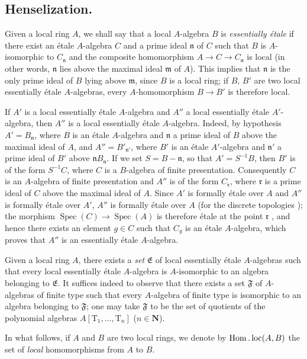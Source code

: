 \subsection{Henselization.}
\label{subsection:IV.18.6}

\begin{env}[18.6.1]
\label{IV.18.6.1}
Given a local ring $A$, we shall say that a local $A$-algebra $B$ is \emph{essentially \'etale} if there exist an \'etale $A$-algebra $C$ and a prime ideal $\mathfrak{n}$ of $C$ such that $B$ is $A$-isomorphic to $C_{\mathfrak{n}}$ and the composite homomorphism $A\to C\to C_{\mathfrak{n}}$ is local (in other words, $\mathfrak{n}$ lies above the maximal ideal $\mathfrak{m}$ of $A$).
This implies  that $\mathfrak{n}$ is the only prime ideal of $B$ lying above $\mathfrak{m}$, since $B$ is a local ring;
if $B$, $B'$ are two local essentially \'etale $A$-algebras, every $A$-homomorphism $B\to B'$ is therefore local.

If $A'$ is a local essentially \'etale $A$-algebra and $A''$ a local essentially \'etale $A'$-algebra, then $A''$ is a local essentially \'etale $A$-algebra.
Indeed, by hypothesis $A'=B_{\mathfrak{n}}$, where $B$ is an \'etale $A$-algebra and $\mathfrak{n}$ a prime ideal of $B$ above the maximal ideal of $A$, and $A''=B'_{\mathfrak{n}'}$, where $B'$ is an \'etale $A'$-algebra and $\mathfrak{n}'$ a prime ideal of $B'$ above $\mathfrak{n}B_{\mathfrak{n}}$.
If we set $S=B-\mathfrak{n}$, so that $A'=S^{-1}B$, then $B'$ is of the form $S^{-1}C$, where $C$ is a $B$-algebra of finite presentation.
Consequently $C$ is an $A$-algebra of finite presentation and $A''$ is of the form $C_{\mathfrak{r}}$, where $\mathfrak{r}$ is a prime ideal of $C$ above the maximal ideal of $A$.
Since $A'$ is formally \'etale over $A$ and $A''$ is formally \'etale over $A'$, $A''$ is formally \'etale over $A$ (for the discrete topologies );
the morphism $\operatorname{Spec}(C)\to\operatorname{Spec}(A)$ is therefore \'etale at the point $\mathfrak{r}$ , and hence there exists an element $g\in C$ such that $C_g$ is an \'etale $A$-algebra, which proves that $A''$ is an essentially \'etale $A$-algebra.

Given a local ring $A$, there exists a \emph{set} $\mathfrak{E}$ of local essentially \'etale $A$-algebras such that every local essentially \'etale $A$-algebra is $A$-isomorphic to an algebra belonging to $\mathfrak{E}$.
It suffices indeed to observe that there exists a set $\mathfrak{F}$ of $A$-algebras of finite type such that every $A$-algebra of finite type is isomorphic to an algebra belonging to $\mathfrak{F}$;
one may take $\mathfrak{F}$ to be the set of quotients of the polynomial algebras $A[\mathrm{T}_1,\ldots,\mathrm{T}_n]$ ($n\in\mathbf{N}$).

In what follows, if $A$ and $B$ are two local rings, we denote by $\operatorname{Hom}.\operatorname{loc}(A,B)$ the set of \emph{local} homomorphisms from $A$ to $B$.
\end{env}

